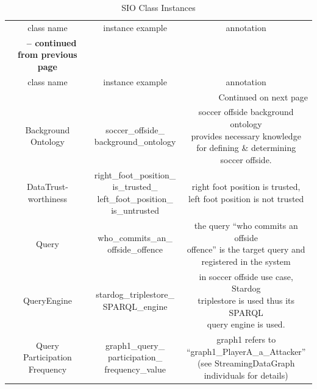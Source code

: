 \begin{center}
\begin{longtable}{|c||c||c|}
	\caption[SIO Class Instances]{SIO Class Instances} \label{tab:app-gi} \\
	\hline \multicolumn{1}{|c||}{class name} & \multicolumn{1}{c||}{instance example} & \multicolumn{1}{c|}{annotation} \\ \hhline{|=#=#=|}
	\endfirsthead
	\multicolumn{3}{c}%
	{{\bfseries \tablename\ \thetable{} -- continued from previous page}} \\
	\hline \multicolumn{1}{|c||}{class name} &
	\multicolumn{1}{c||}{instance example} &
	\multicolumn{1}{c|}{annotation} \\ \hline 
	\endhead
	\hline \multicolumn{3}{|r|}{{Continued on next page}} \\ \hline
	\endfoot
	\hline
	\endlastfoot
	\makecell{Background\\Ontology} & \makecell{soccer\_offside\_\\background\_ontology} & \makecell[l]{soccer offside background ontology \\ provides necessary knowledge \\ for defining \& determining \\soccer offside.} \\ \hline
	\makecell{DataTrust-\\worthiness} & \makecell{right\_foot\_position\_\\is\_trusted\_\\left\_foot\_position\_\\is\_untrusted} & \makecell[l]{right foot position is trusted, \\left foot position is not trusted} \\ \hline
	Query & \makecell{who\_commits\_an\_\\offside\_offence} & \makecell[l]{the query ``who commits an offside \\offence'' is the target query and \\registered in the system} \\ \hline
	QueryEngine & \makecell{stardog\_triplestore\_\\SPARQL\_engine} & \makecell[l]{in soccer offside use case, Stardog \\triplestore is used thus its SPARQL \\query engine is used.} \\ \hline
	\makecell{Query\\Participation\\Frequency} & \makecell{graph1\_query\_\\participation\_\\frequency\_value} & \makecell[l]{graph1 refers to\\``graph1\_PlayerA\_a\_Attacker''\\ (see StreamingDataGraph \\individuals for details)} \\ \hline

\end{longtable}
\end{center}
